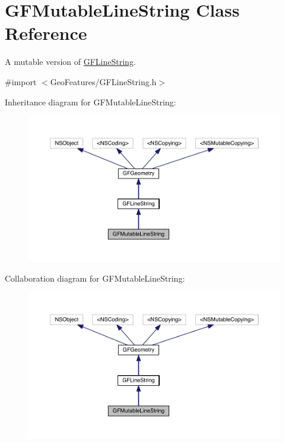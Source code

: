 \hypertarget{interface_g_f_mutable_line_string}{}\section{G\+F\+Mutable\+Line\+String Class Reference}
\label{interface_g_f_mutable_line_string}


A mutable version of \hyperlink{interface_g_f_line_string}{G\+F\+Line\+String}.  




{\ttfamily \#import $<$Geo\+Features/\+G\+F\+Line\+String.\+h$>$}



Inheritance diagram for G\+F\+Mutable\+Line\+String\+:
\nopagebreak
\begin{figure}[H]
\begin{center}
\leavevmode
\includegraphics[width=350pt]{interface_g_f_mutable_line_string__inherit__graph}
\end{center}
\end{figure}


Collaboration diagram for G\+F\+Mutable\+Line\+String\+:
\nopagebreak
\begin{figure}[H]
\begin{center}
\leavevmode
\includegraphics[width=350pt]{interface_g_f_mutable_line_string__coll__graph}
\end{center}
\end{figure}
